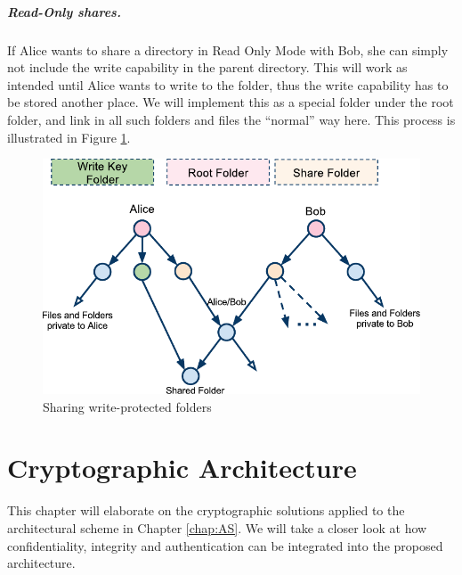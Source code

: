 \documentclass[pdftex,english,10pt,b5paper,twoside]{book}
\begin{document}
\paragraph{Read-Only shares.}

If Alice wants to share a directory in Read Only Mode with Bob, she can simply
not include the write capability in the parent directory. This will work as
intended until Alice wants to write to the folder, thus the write capability has to
be stored another place. We will implement this as a special folder under the
root folder, and link in all such folders and files the ``normal'' way here.
This process is illustrated in Figure \ref{fig:AS:readonly}.

\begin{figure}[h!]
    \centering
    \includegraphics[width=\columnwidth]{ArchitectureShareReadOnlyFolder.pdf}
    \caption{Sharing write-protected folders}
    \label{fig:AS:readonly}
\end{figure}

\chapter{Cryptographic Architecture}
\label{chap:CS}
This chapter will elaborate on the cryptographic solutions applied to the
architectural scheme in Chapter \ref{chap:AS}. We will take a closer look at
how confidentiality, integrity and authentication can be integrated into the
proposed architecture.

\end{document}

